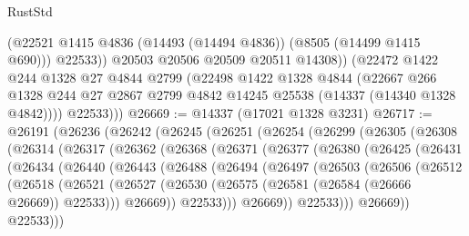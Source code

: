 \begin{lexlean}{RustStd}
\begin{coremodule}
                (@22521 @1415 @4836 (@14493 (@14494 @4836)) (@8505 (@14499 @1415 @690)))
                @22533))
            @20503
            @20506
            @20509
            @20511
            @14308))
        (@22472
          @1422
          @244
          @1328
          @27
          @4844
          @2799
          (@22498
            @1422
            @1328
            @4844
            (@22667
              @266
              @1328
              @244
              @27
              @2867
              @2799
              @4842
              @14245
              @25538
              (@14337 (@14340 @1328 @4842))))
          @22533)))
@26669 := @14337 (@17021 @1328 @3231)
@26717 := @26191
    (@26236
      (@26242
        (@26245
          (@26251
            (@26254
              (@26299
                (@26305
                  (@26308
                    (@26314
                      (@26317
                        (@26362
                          (@26368
                            (@26371
                              (@26377
                                (@26380
                                  (@26425
                                    (@26431
                                      (@26434
                                        (@26440
                                          (@26443
                                            (@26488
                                              (@26494
                                                (@26497
                                                  (@26503
                                                    (@26506
                                                      (@26512
                                                        (@26518
                                                          (@26521
                                                            (@26527
                                                              (@26530
                                                                (@26575
                                                                  (@26581
                                                                    (@26584 (@26666 @26669))
                                                                    @22533)))
                                                              @26669))
                                                          @22533)))
                                                    @26669))
                                                @22533)))
                                          @26669))
                                      @22533)))

\end{coremodule}
\end{lexlean}
